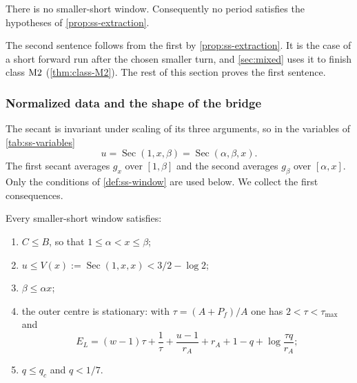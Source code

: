\begin{theorem}\label{thm:m2-smaller-short}
There is no smaller-short window. Consequently no period
satisfies the hypotheses of \cref{prop:ss-extraction}.
\end{theorem}

The second sentence follows from the first by \cref{prop:ss-extraction}. It is the case of a short
forward run after the chosen smaller turn, and \cref{sec:mixed} uses it to finish class
$\mathrm{M2}$ (\cref{thm:class-M2}). The rest of this section proves the first sentence.

\subsubsection{Normalized data and the shape of the bridge}\label{sec:ss-normalized}

The secant is invariant under scaling of its three arguments, so in the variables of
\cref{tab:ss-variables}
\begin{equation}\label{eq:ss-equal-secants}
  u=\operatorname{Sec}(1,x,\beta)=\operatorname{Sec}(\alpha,\beta,x).
\end{equation}
The first secant averages $g_x$ over $[1,\beta]$ and the second averages $g_\beta$ over
$[\alpha,x]$. Only the conditions of \cref{def:ss-window} are used below. We collect the first
consequences.

\begin{lemma}\label{lem:ss-first}
Every smaller-short window satisfies:
\begin{enumerate}[label=(\alph*)]
\item $C\le B$, so that $1\le\alpha<x\le\beta$;
\item $u\le V(x):=\operatorname{Sec}(1,x,x)<3/2-\log2$;
\item $\beta\le\alpha x$;
\item the outer centre is stationary: with $\tau=(A+P_f)/A$ one has $2<\tau<\tau_{\max}$ and
  \begin{equation}\label{eq:ss-root}
    E_L=(w-1)\tau+\frac1\tau+\frac{u-1}{r_A}+r_A+1-q+\log\frac{\tau q}{r_A};
  \end{equation}
\item $q\le q_c$ and $q<1/7$.
\end{enumerate}
\end{lemma}

